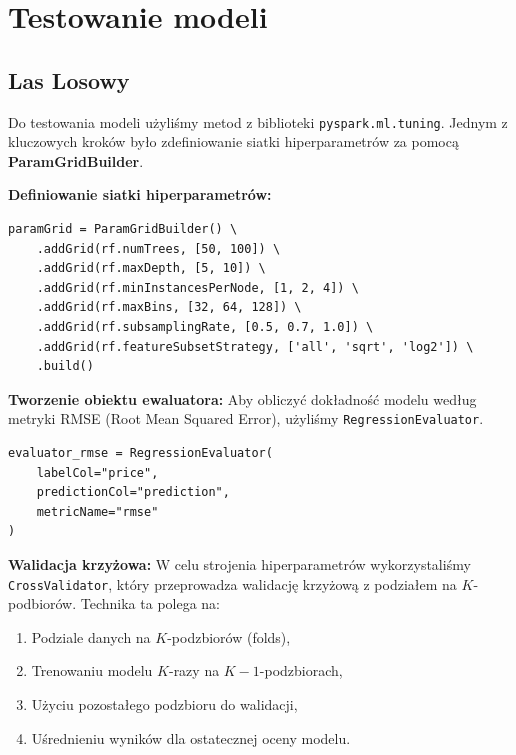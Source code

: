 \documentclass[12pt, a4paper]{report}
\begin{document}
\section{Testowanie modeli}

\subsection{Las Losowy}

\noindent Do testowania modeli użyliśmy metod z biblioteki \texttt{pyspark.ml.tuning}.  
Jednym z kluczowych kroków było zdefiniowanie siatki hiperparametrów za pomocą \textbf{ParamGridBuilder}.

\vspace{0.5em}

\noindent \textbf{Definiowanie siatki hiperparametrów:}
\begin{lstlisting}[caption={Siatka hiperparametrów dla modelu}]
paramGrid = ParamGridBuilder() \
    .addGrid(rf.numTrees, [50, 100]) \
    .addGrid(rf.maxDepth, [5, 10]) \
    .addGrid(rf.minInstancesPerNode, [1, 2, 4]) \
    .addGrid(rf.maxBins, [32, 64, 128]) \
    .addGrid(rf.subsamplingRate, [0.5, 0.7, 1.0]) \
    .addGrid(rf.featureSubsetStrategy, ['all', 'sqrt', 'log2']) \
    .build()
\end{lstlisting}

\vspace{1em}

\noindent \textbf{Tworzenie obiektu ewaluatora:}  
Aby obliczyć dokładność modelu według metryki RMSE (Root Mean Squared Error), użyliśmy \texttt{RegressionEvaluator}.

\begin{lstlisting}[caption={Ewaluator dla metryki RMSE}]
evaluator_rmse = RegressionEvaluator(
    labelCol="price",
    predictionCol="prediction",
    metricName="rmse"
)
\end{lstlisting}

\vspace{1em}

\noindent \textbf{Walidacja krzyżowa:}  
W celu strojenia hiperparametrów wykorzystaliśmy \texttt{CrossValidator}, który przeprowadza walidację krzyżową z podziałem na \( K \)-podbiorów.  
Technika ta polega na:
\begin{enumerate}
    \item Podziale danych na \( K \)-podzbiorów (folds),
    \item Trenowaniu modelu \( K \)-razy na \( K-1 \)-podzbiorach,
    \item Użyciu pozostałego podzbioru do walidacji,
    \item Uśrednieniu wyników dla ostatecznej oceny modelu.
\end{enumerate}
\end{document}
